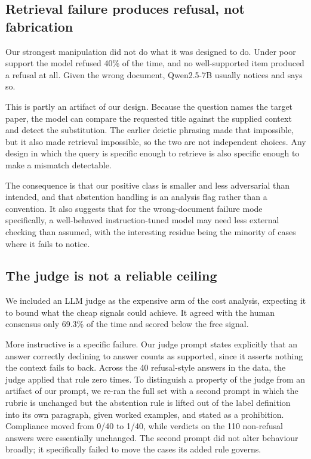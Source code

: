 \documentclass[11pt,a4paper]{article}
\begin{document}
\subsection{Retrieval failure produces refusal, not fabrication}

Our strongest manipulation did not do what it was designed to do. Under poor
support the model refused 40\% of the time, and no well-supported item produced
a refusal at all. Given the wrong document, Qwen2.5-7B usually notices and says
so.

This is partly an artifact of our design. Because the question names the target
paper, the model can compare the requested title against the supplied context
and detect the substitution. The earlier deictic phrasing made that impossible,
but it also made retrieval impossible, so the two are not independent choices.
Any design in which the query is specific enough to retrieve is also specific
enough to make a mismatch detectable.

The consequence is that our positive class is smaller and less adversarial than
intended, and that abstention handling is an analysis flag rather than a
convention. It also suggests that for the wrong-document failure mode
specifically, a well-behaved instruction-tuned model may need less external
checking than assumed, with the interesting residue being the minority of cases
where it fails to notice.

\subsection{The judge is not a reliable ceiling}

We included an LLM judge as the expensive arm of the cost analysis, expecting it
to bound what the cheap signals could achieve. It agreed with the human
consensus only 69.3\% of the time and scored below the free signal.

More instructive is a specific failure. Our judge prompt states explicitly that
an answer correctly declining to answer counts as supported, since it asserts
nothing the context fails to back. Across the 40 refusal-style answers in the
data, the judge applied that rule zero times. To distinguish a property of the
judge from an artifact of our prompt, we re-ran the full set with a second
prompt in which the rubric is unchanged but the abstention rule is lifted out of
the label definition into its own paragraph, given worked examples, and stated as
a prohibition. Compliance moved from 0/40 to 1/40, while verdicts on the 110
non-refusal answers were essentially unchanged. The second prompt did not alter
behaviour broadly; it specifically failed to move the cases its added rule
governs.
\end{document}
